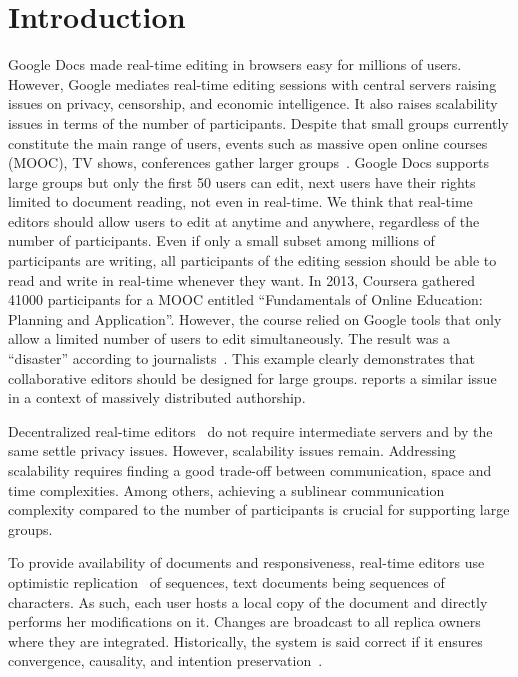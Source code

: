 

\section{Introduction}

Google Docs made real-time editing in browsers easy for millions of
users. However, Google mediates real-time editing sessions with
central servers raising issues on privacy, censorship, and economic
intelligence. It also raises scalability issues in terms of the number
of participants.  Despite that small groups currently constitute the
main range of users, events such as massive open online courses (MOOC),
TV shows, conferences gather larger groups~\cite{breslow2013studying}.
Google Docs supports large groups but only the first 50 users can edit,
next users have their rights limited to document reading, not even in
real-time.  We think that real-time editors should allow users to edit 
at anytime and anywhere, regardless of the number of participants. Even if
only a small subset among millions of participants are writing, all
participants of the editing session should be able to read and write
in real-time whenever they want. In 2013, Coursera gathered 41000
participants for a MOOC entitled ``Fundamentals of Online Education:
Planning and Application''. However, the course relied on Google tools
that only allow a limited number of users to edit simultaneously.  The result
was a ``disaster'' according to journalists~\cite{slate13,wp13}. This example
clearly demonstrates that collaborative editors should be designed for large
groups. \cite{chi12} reports a similar issue in a context of massively
distributed authorship.

Decentralized real-time editors~\cite{oster2006data, sun1998operational,
  sun2009contextbased} do not require intermediate servers and by the same
settle privacy issues. However, scalability issues remain.  Addressing
scalability requires finding a good trade-off between communication, space and
time complexities. Among others, achieving a sublinear communication complexity
compared to the number of participants is crucial for supporting large groups.

To provide availability of documents and responsiveness, real-time editors use
optimistic replication~\cite{saito2005optimistic} of sequences, text documents
being sequences of characters. As such, each user hosts a local copy of the
document and directly performs her modifications on it. Changes are broadcast to
all replica owners where they are integrated. Historically, the system is said
correct if it ensures convergence, causality, and intention
preservation~\cite{sun1998achieving}.

